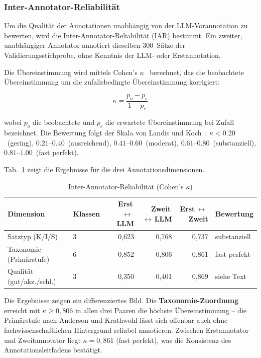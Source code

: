 \subsubsection{Inter-Annotator-Reliabilität}\label{sec:eval-kappa}

Um die Qualität der Annotationen unabhängig von der LLM-Vorannotation zu bewerten, wird die Inter-Annotator-Reliabilität (IAR) bestimmt.
Ein zweiter, unabhängiger Annotator annotiert dieselben 300~Sätze der Validierungsstichprobe, ohne Kenntnis der LLM- oder Erstannotation.

Die Übereinstimmung wird mittels Cohen's $\kappa$~\cite{cohen1960coefficient} berechnet, das die beobachtete Übereinstimmung um die zufallsbedingte Übereinstimmung korrigiert:

\begin{equation}\label{eq:kappa}
\kappa = \frac{p_o - p_e}{1 - p_e}
\end{equation}

\noindent wobei $p_o$ die beobachtete und $p_e$ die erwartete Übereinstimmung bei Zufall bezeichnet.
Die Bewertung folgt der Skala von Landis und Koch~\cite{landis1977measurement}: $\kappa < 0.20$~(gering), $0.21$--$0.40$~(ausreichend), $0.41$--$0.60$~(moderat), $0.61$--$0.80$~(substanziell), $0.81$--$1.00$~(fast perfekt).

Tab.~\ref{tab:kappa} zeigt die Ergebnisse für die drei Annotationsdimensionen.

\begin{table}[H]
\caption{Inter-Annotator-Reliabilität (Cohen's $\kappa$)\label{tab:kappa}}
\centering
\begin{tabular}{llrrrl}
\hline
\textbf{Dimension} & \textbf{Klassen} & \textbf{Erst\,$\leftrightarrow$\,LLM} & \textbf{Zweit\,$\leftrightarrow$\,LLM} & \textbf{Erst\,$\leftrightarrow$\,Zweit} & \textbf{Bewertung} \\
\hline
Satztyp (K/I/S) & 3 & 0{,}623 & 0{,}768 & 0{,}737 & substanziell \\
Taxonomie (Primärstufe) & 6 & 0{,}852 & 0{,}806 & 0{,}861 & fast perfekt \\
Qualität (gut/akz./schl.) & 3 & 0{,}350 & 0{,}401 & 0{,}869 & siehe Text \\
\hline
\end{tabular}
\end{table}

Die Ergebnisse zeigen ein differenziertes Bild.
Die \textbf{Taxonomie-Zuordnung} erreicht mit $\kappa \geq 0{,}806$ in allen drei Paaren die höchste Übereinstimmung -- die Primärstufe nach Anderson und Krathwohl lässt sich offenbar auch ohne fachwissenschaftlichen Hintergrund reliabel annotieren.
Zwischen Erstannotator und Zweitannotator liegt $\kappa = 0{,}861$ (fast perfekt), was die Konsistenz des Annotationsleitfadens bestätigt.

